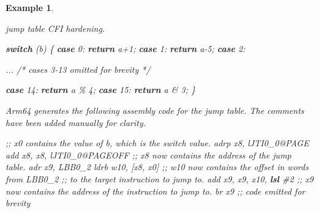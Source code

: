 \documentclass[
  a4paper,
]{report}
\newtheorem{example}{Example}
\newenvironment{Shaded}{}{}
\newcommand{\CommentTok}[1]{\textcolor[rgb]{0.38,0.63,0.69}{\textit{#1}}}
\newcommand{\ControlFlowTok}[1]{\textcolor[rgb]{0.00,0.44,0.13}{\textbf{#1}}}
\newcommand{\DecValTok}[1]{\textcolor[rgb]{0.25,0.63,0.44}{#1}}
\newcommand{\KeywordTok}[1]{\textcolor[rgb]{0.00,0.44,0.13}{\textbf{#1}}}
\newcommand{\NormalTok}[1]{#1}
\newcommand{\OperatorTok}[1]{\textcolor[rgb]{0.40,0.40,0.40}{#1}}
\begin{document}
\begin{example}

\label{}

\textup{jump table CFI hardening.}

\begin{Shaded}
\begin{Highlighting}[]
  \ControlFlowTok{switch} \OperatorTok{(}\NormalTok{b}\OperatorTok{)} \OperatorTok{\{}
    \ControlFlowTok{case} \DecValTok{0}\OperatorTok{:}
      \ControlFlowTok{return}\NormalTok{ a}\OperatorTok{+}\DecValTok{1}\OperatorTok{;}
    \ControlFlowTok{case} \DecValTok{1}\OperatorTok{:}
      \ControlFlowTok{return}\NormalTok{ a}\OperatorTok{{-}}\DecValTok{5}\OperatorTok{;}
    \ControlFlowTok{case} \DecValTok{2}\OperatorTok{:}

      \OperatorTok{...} \CommentTok{/* cases 3{-}13 omitted for brevity */}

    \ControlFlowTok{case} \DecValTok{14}\OperatorTok{:}
      \ControlFlowTok{return}\NormalTok{ a }\OperatorTok{\%} \DecValTok{4}\OperatorTok{;}
    \ControlFlowTok{case} \DecValTok{15}\OperatorTok{:}
      \ControlFlowTok{return}\NormalTok{ a }\OperatorTok{\&} \DecValTok{3}\OperatorTok{;}
    \OperatorTok{\}}
\end{Highlighting}
\end{Shaded}

Arm64 generates the following assembly code for the jump table. The
comments have been added manually for clarity.

\begin{Shaded}
\begin{Highlighting}[]
  \CommentTok{;; x0 contains the value of b, which is the switch value.}
\NormalTok{  adrp  x8}\OperatorTok{,}\NormalTok{ lJTI0\_0}\CommentTok{@PAGE}
\NormalTok{  add   x8}\OperatorTok{,}\NormalTok{ x8}\OperatorTok{,}\NormalTok{ lJTI0\_0}\CommentTok{@PAGEOFF}
  \CommentTok{;; x8 now contains the address of the jump table.}
\NormalTok{  adr   x9}\OperatorTok{,}\NormalTok{ LBB0\_2}
\NormalTok{  ldrb  w10}\OperatorTok{,} \OperatorTok{[}\NormalTok{x8}\OperatorTok{,}\NormalTok{ x0}\OperatorTok{]}
  \CommentTok{;; w10 now contains the offset in words from LBB0\_2}
  \CommentTok{;; to the target instruction to jump to.}
\NormalTok{  add   x9}\OperatorTok{,}\NormalTok{ x9}\OperatorTok{,}\NormalTok{ x10}\OperatorTok{,} \KeywordTok{lsl} \CommentTok{\#2}
  \CommentTok{;; x9 now contains the address of the instruction to jump to.}
\NormalTok{  br    x9}
  \CommentTok{;; code emitted for brevity}


\end{Highlighting}
\end{Shaded}
\end{example}
\end{document}
